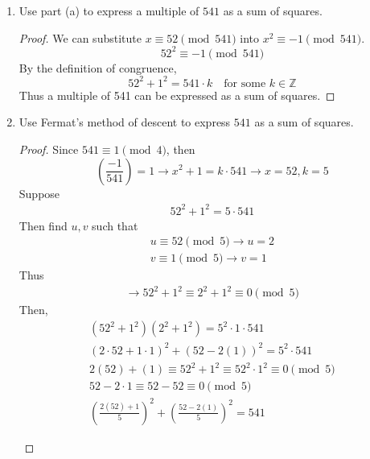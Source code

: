 \documentclass[11pt]{article}
\theoremstyle{definition}
\newcommand{\ZZ}{\mathbb{Z}}
\newcommand{\legendre}[2]{\ensuremath{\left( \frac{#1}{#2} \right) }}
\begin{document}
\begin{enumerate}
\begin{enumerate}
        \item Use part (a) to express a multiple of $541$ as a sum of squares.
        \begin{proof}
            We can substitute $x\equiv 52\pmod{541}$ into $x^2\equiv -1\pmod{541}$. 
            \[
                52^2 \equiv -1 \pmod{541} 
            \]
            By the definition of congruence, 
            \[
                52^2 + 1^2 = 541\cdot k \quad\text{for some } k\in\ZZ
            \]
            Thus a multiple of 541 can be expressed as a sum of squares.
        \end{proof}
    
        \item Use Fermat's method of descent to express $541$ as a sum of squares.
        \begin{proof}
            Since $541\equiv 1\pmod{4}$, then 
            \[
                \legendre{-1}{541} = 1 \rightarrow x^2 + 1 = k\cdot 541 \rightarrow x = 52, k = 5
            \]
            Suppose
            \begin{align*}
                52^2 + 1^2 = 5\cdot 541
            \end{align*}
            Then find $u,v$ such that 
            \begin{align*}
                u\equiv 52\pmod{5} \rightarrow u = 2\\
                v\equiv 1\pmod{5} \rightarrow v = 1 
            \end{align*}
            Thus
            \begin{align*}
                \rightarrow 52^2+1^2 \equiv 2^2 + 1^2 \equiv 0 \pmod{5}
            \end{align*}
            Then,
            \begin{align*}
                (52^2+1^2)(2^2+1^2) = 5^2\cdot 1\cdot 541 \\
                (2\cdot 52+1\cdot 1)^2 + (52-2(1))^2 = 5^2\cdot 541 \\
                2(52)+(1) \equiv 52^2 + 1^2\equiv 52^2\cdot 1^2 \equiv 0\pmod{5} \\
                52-2\cdot1\equiv 52-52\equiv 0\pmod{5} \\
                (\frac{2(52) + 1}{5})^2 + (\frac{52-2(1)}{5})^2 = 541
            \end{align*}
            \begin{center}
            \end{center}
        \end{proof}
    

\end{enumerate}
\end{enumerate}
\end{document}
